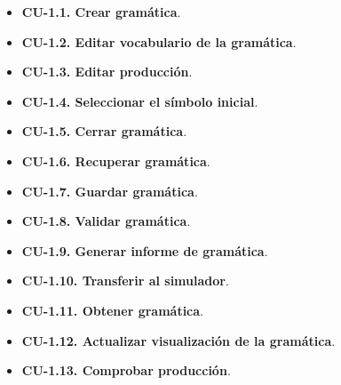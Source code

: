  \begin{itemize}
  \item \textbf{CU-1.1. Crear gramática}.
  \item \textbf{CU-1.2. Editar vocabulario de la gramática}.
  \item \textbf{CU-1.3. Editar producción}.
  \item \textbf{CU-1.4. Seleccionar el símbolo inicial}.
  \item \textbf{CU-1.5. Cerrar gramática}.
  \item \textbf{CU-1.6. Recuperar gramática}.
  \item \textbf{CU-1.7. Guardar gramática}.
  \item \textbf{CU-1.8. Validar gramática}.
  \item \textbf{CU-1.9. Generar informe de gramática}.
  \item \textbf{CU-1.10. Transferir al simulador}.
  \item \textbf{CU-1.11. Obtener gramática}.
  \item \textbf{CU-1.12. Actualizar visualización de la gramática}.
  \item \textbf{CU-1.13. Comprobar producción}.
 \end{itemize}


